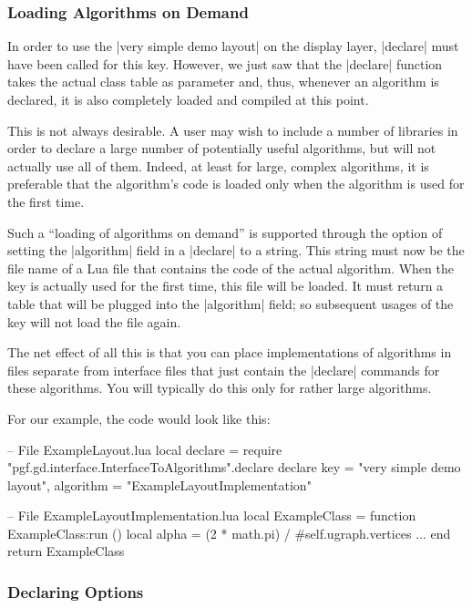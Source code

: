 \subsubsection{Loading Algorithms on Demand}

In order to use the |very simple demo layout| on the display layer,
|declare| must have been called for this key. However, we just saw
that the |declare| function takes the actual class table as parameter
and, thus, whenever an algorithm is declared, it is also completely
loaded and compiled at this point.

This is not always desirable. A user may wish to include a number of
libraries in order to declare a large number of potentially useful
algorithms, but will not actually use all of them. Indeed, at least
for large, complex algorithms, it is preferable that the algorithm's
code is loaded only when the algorithm is used for the first time.

Such a ``loading of algorithms on demand'' is supported through the
option of setting the |algorithm| field in a |declare| to a
string. This string must now be the file name of a Lua file that
contains the code of the actual algorithm. When the key is actually
used for the first time, this file will be loaded. It must return a
table that will be plugged into the |algorithm| field; so subsequent
usages of the key will not load the file again.

The net effect of all this is that you can place implementations of
algorithms in files separate from interface files that just contain
the |declare| commands for these algorithms. You will typically do
this only for rather large algorithms.

For our example, the code would look like this:

\begin{codeexample}[code only, tikz syntax=false]
-- File ExampleLayout.lua
local declare = require "pgf.gd.interface.InterfaceToAlgorithms".declare  
declare {
  key = "very simple demo layout",
  algorithm = "ExampleLayoutImplementation"
}
\end{codeexample}

\begin{codeexample}[code only, tikz syntax=false]
-- File ExampleLayoutImplementation.lua
local ExampleClass = {}
function ExampleClass:run ()
  local alpha = (2 * math.pi) / #self.ugraph.vertices
  ...
end
return ExampleClass
\end{codeexample}


\subsubsection{Declaring Options}

